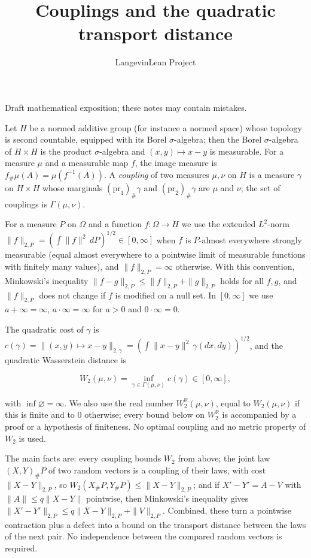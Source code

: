 \documentclass[11pt,a4paper]{article}
\title{\texorpdfstring{Couplings and the quadratic transport distance}{Couplings and the quadratic transport distance}}
\author{LangevinLean Project}
\date{}
\begin{document}
\maketitle
Draft mathematical exposition; these notes may contain mistakes.


Let \(H\) be a normed additive group (for instance a normed space) whose topology is second countable, equipped with its Borel \(\sigma\)-algebra; then the Borel \(\sigma\)-algebra of \(H\times H\) is the product \(\sigma\)-algebra and \((x,y)\mapsto x-y\) is measurable. For a measure \(\mu\) and a measurable map \(f\), the image measure is \(f_\#\mu(A)=\mu(f^{-1}(A))\). A \emph{coupling} of two measures \(\mu,\nu\) on \(H\) is a measure \(\gamma\) on \(H\times H\) whose marginals \((\mathrm{pr}_1)_\#\gamma\) and \((\mathrm{pr}_2)_\#\gamma\) are \(\mu\) and \(\nu\); the set of couplings is \(\Gamma(\mu,\nu)\).




For a measure \(P\) on \(\Omega\) and a function \(f:\Omega\to H\) we use the extended \(L^2\)-norm \(\|f\|_{2,P}=(\int\|f\|^2\,dP)^{1/2}\in[0,\infty]\) when \(f\) is \(P\)-almost everywhere strongly measurable (equal almost everywhere to a pointwise limit of measurable functions with finitely many values), and \(\|f\|_{2,P}=\infty\) otherwise. With this convention, Minkowski's inequality \(\|f-g\|_{2,P}\le\|f\|_{2,P}+\|g\|_{2,P}\) holds for all \(f,g\), and \(\|f\|_{2,P}\) does not change if \(f\) is modified on a null set. In \([0,\infty]\) we use \(a+\infty=\infty\), \(a\cdot\infty=\infty\) for \(a>0\) and \(0\cdot\infty=0\).




The quadratic cost of \(\gamma\) is \(c(\gamma)=\|(x,y)\mapsto x-y\|_{2,\gamma}=(\int\|x-y\|^2\,\gamma(dx,dy))^{1/2}\), and the quadratic Wasserstein distance is


\[W_2(\mu,\nu)=\inf_{\gamma\in\Gamma(\mu,\nu)}c(\gamma)\in[0,\infty],\]


with \(\inf\varnothing=\infty\). We also use the real number \(W_2^{\mathbb R}(\mu,\nu)\), equal to \(W_2(\mu,\nu)\) if this is finite and to \(0\) otherwise; every bound below on \(W_2^{\mathbb R}\) is accompanied by a proof or a hypothesis of finiteness. No optimal coupling and no metric property of \(W_2\) is used.




The main facts are: every coupling bounds \(W_2\) from above; the joint law \((X,Y)_\#P\) of two random vectors is a coupling of their laws, with cost \(\|X-Y\|_{2,P}\), so \(W_2(X_\#P,Y_\#P)\le\|X-Y\|_{2,P}\); and if \(X'-Y'=A-V\) with \(\|A\|\le q\|X-Y\|\) pointwise, then Minkowski's inequality gives \(\|X'-Y'\|_{2,P}\le q\|X-Y\|_{2,P}+\|V\|_{2,P}\). Combined, these turn a pointwise contraction plus a defect into a bound on the transport distance between the laws of the next pair. No independence between the compared random vectors is required.
\end{document}

